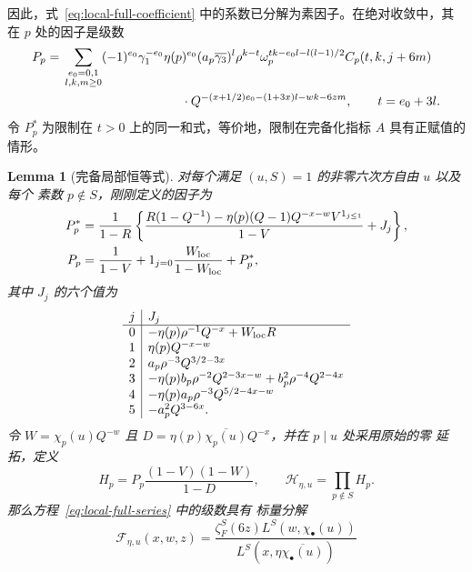 \documentclass[11pt,a4paper]{article}
\numberwithin{equation}{section}
\numberwithin{figure}{section}
\newtheorem{lemma}[theorem]{Lemma}
\theoremstyle{definition}
\theoremstyle{remark}
\begin{document}
因此，式~\eqref{eq:local-full-coefficient} 中的系数已分解为素因子。在绝对收敛中，其在 $p$ 处的因子是级数
\begin{equation}\label{eq:local-P}
\begin{aligned}
 P_p={}&\sum_{\substack{e_0=0,1\\l,k,m\ge0}}
 (-1)^{e_0}\gamma_1^{-e_0}\eta(p)^{e_0}
 (a_p\overline{\gamma_3})^l\rho^{k-t}
 \omega_p^{tk-e_0l-l(l-1)/2}C_p(t,k,j+6m)\\
 &\hspace{33mm}\cdot
 Q^{-(x+1/2)e_0-(1+3x)l-wk-6zm},\qquad t=e_0+3l.
\end{aligned}
\end{equation}
令 $P_p^*$ 为限制在 $t>0$ 上的同一和式，等价地，限制在完备化指标 $A$ 具有正赋值的情形。\begin{lemma}[完备局部恒等式]\label{lem:local-euler}
对每个满足 $(u,S)=1$ 的非零六次方自由 $u$ 以及每个
素数 $p\notin S$，刚刚定义的因子为
\begin{equation}\label{old-eq:5.13a}
\begin{aligned}
 P_p^*&=\frac1{1-R}\left\{
 \frac{R(1-Q^{-1})-\eta(p)(Q-1)
 Q^{-x-w}V^{1_{j\le1}}}{1-V}+J_j\right\},\\
 P_p&=\frac1{1-V}+1_{j=0}\frac{W_{\rm loc}}{1-W_{\rm loc}}+P_p^*,
\end{aligned}
\end{equation}
其中 $J_j$ 的六个值为
\[
\begin{array}{c|l}
 j&J_j\\\hline
 0&-\eta(p)\rho^{-1}Q^{-x}+W_{\rm loc}R\\
 1&\eta(p)Q^{-x-w}\\
 2&a_p\rho^{-3}Q^{3/2-3x}\\
 3&-\eta(p)b_p\rho^{-2}Q^{2-3x-w}
       +b_p^2\rho^{-4}Q^{2-4x}\\
 4&-\eta(p)a_p\rho^{-3}Q^{5/2-4x-w}\\
 5&-a_p^2Q^{3-6x}.
\end{array}
\]
令 $W=\chi_p(u)Q^{-w}$ 且
$D=\eta(p)\overline{\chi_p(u)}Q^{-x}$，并在 $p\mid u$ 处采用原始的零
延拓，定义
\begin{equation}\label{eq:local-H-definition}
 H_p=P_p\frac{(1-V)(1-W)}{1-D},\qquad
 \mathcal H_{\eta,u}=\prod_{p\notin S}H_p.
\end{equation}
那么方程~\eqref{eq:local-full-series} 中的级数具有
标量分解
\begin{equation}\label{eq:probe-high}
 \mathcal F_{\eta,u}(x,w,z)=
 \frac{\zeta_F^S(6z)L^S(w,\chi_\bullet(u))}
 {L^S(x,\eta\overline{\chi_\bullet(u)})}

\end{equation}
\end{lemma}
\end{document}
